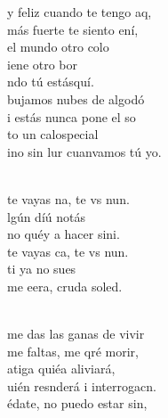 \documentclass[12pt]{article}
\begin{document}
\begin{multicols*}{2}
\begin{cancion}%
	y feliz cuando te tengo aq,\\
	 más fuerte te siento ení,\\
	el mundo  otro colo\\
	iene otro bor \\
	ndo tú estásquí.\\
\jump
	bujamos nubes de algodó\\
	i estás nunca pone el so\\
	to un calospecial \\
	ino sin lur cuanvamos tú yo.\\\jump\\
	\begin{chorus}%
	 te vayas na, te vs nun.\\
	lgún díú notás\\
	no  quéy a hacer sini. \\
	 te vayas ca, te vs nun.\\
	ti ya no  sues\\
	me eera, cruda soled.\\
	\end{chorus}%
	\jump\\
	 me das las ganas de vivir\\
	me faltas, me qré morir,\\
	atiga quiéa aliviará,\\
	uién resnderá i interrogacn. \\
\jump
	édate, no puedo estar sin,\\

\end{cancion}
\end{multicols*}
\end{document}
